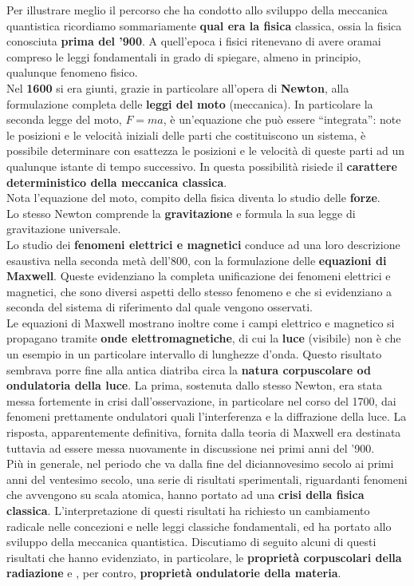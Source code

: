 \documentclass[a4paper,12pt,oneside]{book}
\begin{document}
Per illustrare meglio il percorso che ha condotto allo sviluppo della meccanica quantistica ricordiamo sommariamente \textbf{qual era la fisica} classica, ossia la fisica conosciuta \textbf{prima del '900}.  A quell'epoca i fisici ritenevano di avere oramai compreso le leggi fondamentali in grado di spiegare, almeno in principio, qualunque fenomeno fisico.\\
Nel \textbf{1600} si era giunti, grazie in particolare all'opera di \textbf{Newton}, alla formulazione completa delle \textbf{leggi del moto} (meccanica). In particolare la seconda legge del moto, $F=ma$, è un'equazione che può essere ``integrata'': note le posizioni e le velocità iniziali delle parti che costituiscono un sistema, è possibile determinare con esattezza le posizioni e le velocità di queste parti ad un qualunque istante di tempo successivo. In questa possibilità risiede il \textbf{carattere deterministico della meccanica classica}.\\
Nota l'equazione del moto, compito della fisica diventa lo studio delle \textbf{forze}.\\
Lo stesso Newton comprende la \textbf{gravitazione} e formula la sua legge di gravitazione universale.\\
Lo studio dei \textbf{fenomeni elettrici e magnetici} conduce ad una loro descrizione esaustiva nella seconda metà dell'800, con la formulazione delle \textbf{equazioni di Maxwell}. Queste evidenziano la completa unificazione dei fenomeni elettrici e magnetici, che sono diversi aspetti dello stesso fenomeno e che si evidenziano a seconda del sistema di riferimento dal quale vengono osservati.\\

Le equazioni di Maxwell mostrano inoltre come i campi elettrico e magnetico si propagano tramite \textbf{onde elettromagnetiche}, di cui la \textbf{luce} (visibile) non è che un esempio in un particolare intervallo di lunghezze d'onda. Questo risultato sembrava porre fine alla antica diatriba circa la \textbf{natura corpuscolare od ondulatoria della luce}. La prima, sostenuta dallo stesso Newton, era stata messa fortemente in crisi dall'osservazione, in particolare nel corso del 1700, dai fenomeni prettamente ondulatori quali l'interferenza e la diffrazione della luce. La risposta, apparentemente definitiva, fornita dalla teoria di Maxwell era destinata tuttavia ad essere messa nuovamente in discussione nei primi anni del '900.\\

Più in generale, nel periodo che va dalla fine del diciannovesimo secolo ai primi anni del ventesimo secolo, una serie di risultati sperimentali, riguardanti fenomeni che avvengono su scala atomica, hanno portato ad una \textbf{crisi della fisica classica}. L'interpretazione di questi risultati ha richiesto un cambiamento radicale nelle concezioni e nelle leggi classiche fondamentali, ed ha portato allo sviluppo della meccanica quantistica. Discutiamo di seguito alcuni di questi risultati che hanno evidenziato, in particolare, le \textbf{proprietà corpuscolari della radiazione} e , per contro, \textbf{proprietà ondulatorie della materia}.
\end{document}
